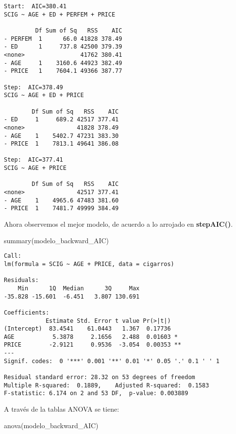 \documentclass[
  a4paper,
  oneside,
  openany]{book}
\newenvironment{Shaded}{\begin{snugshade}}{\end{snugshade}}
\newcommand{\FunctionTok}[1]{\textcolor[rgb]{0.00,0.00,0.00}{#1}}
\newcommand{\NormalTok}[1]{#1}
\begin{document}
\begin{verbatim}
Start:  AIC=380.41
SCIG ~ AGE + ED + PERFEM + PRICE

         Df Sum of Sq   RSS    AIC
- PERFEM  1      66.0 41828 378.49
- ED      1     737.8 42500 379.39
<none>                41762 380.41
- AGE     1    3160.6 44923 382.49
- PRICE   1    7604.1 49366 387.77

Step:  AIC=378.49
SCIG ~ AGE + ED + PRICE

        Df Sum of Sq   RSS    AIC
- ED     1     689.2 42517 377.41
<none>               41828 378.49
- AGE    1    5402.7 47231 383.30
- PRICE  1    7813.1 49641 386.08

Step:  AIC=377.41
SCIG ~ AGE + PRICE

        Df Sum of Sq   RSS    AIC
<none>               42517 377.41
- AGE    1    4965.6 47483 381.60
- PRICE  1    7481.7 49999 384.49
\end{verbatim}

Ahora observemos el mejor modelo, de acuerdo a lo arrojado en \textbf{stepAIC()}.

\begin{Shaded}
\begin{Highlighting}[]
\FunctionTok{summary}\NormalTok{(modelo\_backward\_AIC)}
\end{Highlighting}
\end{Shaded}

\begin{verbatim}
Call:
lm(formula = SCIG ~ AGE + PRICE, data = cigarros)

Residuals:
    Min      1Q  Median      3Q     Max 
-35.828 -15.601  -6.451   3.807 130.691 

Coefficients:
            Estimate Std. Error t value Pr(>|t|)   
(Intercept)  83.4541    61.0443   1.367  0.17736   
AGE           5.3878     2.1656   2.488  0.01603 * 
PRICE        -2.9121     0.9536  -3.054  0.00353 **
---
Signif. codes:  0 '***' 0.001 '**' 0.01 '*' 0.05 '.' 0.1 ' ' 1

Residual standard error: 28.32 on 53 degrees of freedom
Multiple R-squared:  0.1889,    Adjusted R-squared:  0.1583 
F-statistic: 6.174 on 2 and 53 DF,  p-value: 0.003889
\end{verbatim}

A través de la tablas ANOVA se tiene:

\begin{Shaded}
\begin{Highlighting}[]
\FunctionTok{anova}\NormalTok{(modelo\_backward\_AIC)}
\end{Highlighting}
\end{Shaded}
\end{document}
